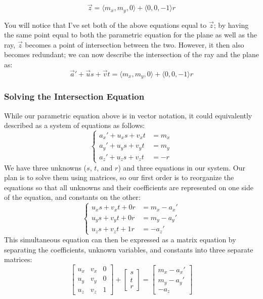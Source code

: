     \begin{equation}
    \vec{z}=\langle m_x, m_y, 0 \rangle + \langle 0, 0, -1 \rangle r
    \end{equation}
\par You will notice that I've set both of the above equations equal to $\vec{z}$; by having the same point equal to both the parametric equation for the plane as well as the ray, $\vec{z}$ becomes a point of intersection between the two. However, it then also becomes redundant; we can now describe the intersection of the ray and the plane as:
    \begin{equation}
    \vec{a}'+\vec{u}s+\vec{v}t=\langle m_x, m_y, 0 \rangle + \langle 0, 0, -1 \rangle r
    \end{equation}

\subsubsection{Solving the Intersection Equation}
While our parametric equation above is in vector notation, it could equivalently described as a system of equations\cite{systems} as follows:
    \begin{equation}
    \begin{cases}
        a_x'+u_x s + v_x t & =  m_x \\
        a_y'+u_y s + v_y t & =  m_y \\
        a_z'+u_z s + v_z t & =  -r
    \end{cases}
    \end{equation}
We have three unknowns ($s$, $t$, and $r$) and three equations in our system. Our plan is to solve them using matrices, so our first order is to reorganize the equations so that all unknowns and their coefficients are represented on one side of the equation, and constants on the other:
    \begin{equation}
    \begin{cases}
        u_x s + v_x t + 0r & =  m_x - a_x' \\
        u_y s + v_y t + 0r & =  m_y - a_y' \\
        u_z s + v_z t + 1r & =  -a_z'
    \end{cases}
    \end{equation}
This simultaneous equation can then be expressed as a matrix equation by separating the coefficients, unknown variables, and constants into three separate matrices:
    \begin{equation}
    \begin{bmatrix}
        u_x & v_x & 0 \\
        u_y & v_y & 0 \\
        u_z & v_z & 1
    \end{bmatrix}
    +
    \begin{bmatrix}
        s \\
        t \\
        r
    \end{bmatrix}
    =
    \begin{bmatrix}
    m_x - a_x' \\
    m_y - a_y' \\
    -a_z
    \end{bmatrix}
    \end{equation}
